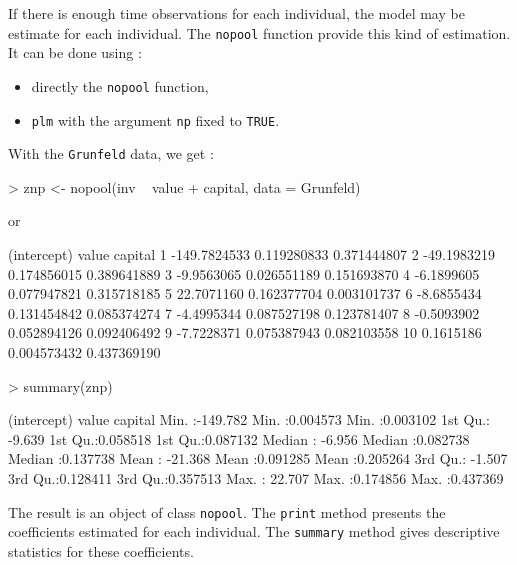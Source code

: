 \documentclass{article}
\begin{document}
If there is enough time observations for each individual, the model
may be estimate for each individual. The \texttt{nopool} function
provide this kind of estimation. It can be done using :

\begin{itemize}
\item directly the \texttt{nopool} function,
\item \texttt{plm} with the argument \texttt{np} fixed to \texttt{TRUE}.
\end{itemize}

With the \texttt{Grunfeld} data, we get :

\begin{Schunk}
\begin{Sinput}
> znp <- nopool(inv ~ value + capital, data = Grunfeld)
\end{Sinput}
\end{Schunk}

or 

\begin{Schunk}
\begin{Soutput}
    (intercept)       value     capital
1  -149.7824533 0.119280833 0.371444807
2   -49.1983219 0.174856015 0.389641889
3    -9.9563065 0.026551189 0.151693870
4    -6.1899605 0.077947821 0.315718185
5    22.7071160 0.162377704 0.003101737
6    -8.6855434 0.131454842 0.085374274
7    -4.4995344 0.087527198 0.123781407
8    -0.5093902 0.052894126 0.092406492
9    -7.7228371 0.075387943 0.082103558
10    0.1615186 0.004573432 0.437369190
\end{Soutput}
\begin{Sinput}
> summary(znp)
\end{Sinput}
\begin{Soutput}
  (intercept)           value             capital        
 Min.   :-149.782   Min.   :0.004573   Min.   :0.003102  
 1st Qu.:  -9.639   1st Qu.:0.058518   1st Qu.:0.087132  
 Median :  -6.956   Median :0.082738   Median :0.137738  
 Mean   : -21.368   Mean   :0.091285   Mean   :0.205264  
 3rd Qu.:  -1.507   3rd Qu.:0.128411   3rd Qu.:0.357513  
 Max.   :  22.707   Max.   :0.174856   Max.   :0.437369  
\end{Soutput}
\end{Schunk}


The result is an object of class  \texttt{nopool}. The \texttt{print}
method presents the coefficients estimated for each individual. The
\texttt{summary} method gives descriptive statistics for these coefficients.
\end{document}

